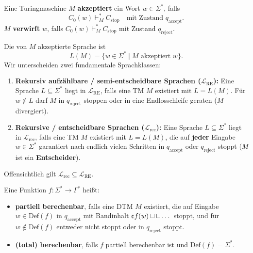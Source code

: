 \begin{definition}
    Eine Turingmaschine $M$ \textbf{akzeptiert} ein Wort $w \in \Sigma^*$, falls
    \[
        C_0(w) \vdash_M^* C_{\mathrm{stop}} \quad \text{mit Zustand } q_{\mathrm{accept}}.
    \]
    $M$ \textbf{verwirft} $w$, falls $C_0(w) \vdash_M^* C_{\mathrm{stop}}$ mit Zustand $q_{\mathrm{reject}}$. 
    
    Die von $M$ akzeptierte Sprache ist
    \[
        L(M) = \{w \in \Sigma^* \mid M \text{ akzeptiert } w\}.
    \]
    Wir unterscheiden zwei fundamentale Sprachklassen:
    \begin{enumerate}
        \item \textbf{Rekursiv aufzählbare / semi-entscheidbare Sprachen ($\mathcal{L}_{\mathrm{RE}}$):}
        Eine Sprache $L \subseteq \Sigma^*$ liegt in $\mathcal{L}_{\mathrm{RE}}$, falls eine TM $M$ existiert mit $L = L(M)$. Für $w \notin L$ darf $M$ in $q_{\mathrm{reject}}$ stoppen oder in eine Endlosschleife geraten ($M$ divergiert).
        \item \textbf{Rekursive / entscheidbare Sprachen ($\mathcal{L}_{\mathrm{rec}}$):}
        Eine Sprache $L \subseteq \Sigma^*$ liegt in $\mathcal{L}_{\mathrm{rec}}$, falls eine TM $M$ existiert mit $L = L(M)$, die auf \textbf{jeder} Eingabe $w \in \Sigma^*$ garantiert nach endlich vielen Schritten in $q_{\mathrm{accept}}$ oder $q_{\mathrm{reject}}$ stoppt ($M$ ist ein \textbf{Entscheider}).
    \end{enumerate}
    Offensichtlich gilt $\mathcal{L}_{\mathrm{rec}} \subseteq \mathcal{L}_{\mathrm{RE}}$.
\end{definition}

\begin{definition}
    Eine Funktion $f : \Sigma^* \to \Gamma^*$ heißt:
    \begin{itemize}
        \item \textbf{partiell berechenbar}, falls eine DTM $M$ existiert, die auf Eingabe $w \in \mathrm{Def}(f)$ in $q_{\mathrm{accept}}$ mit Bandinhalt $\text{\textcent} f(w) \sqcup \sqcup \dots$ stoppt, und für $w \notin \mathrm{Def}(f)$ entweder nicht stoppt oder in $q_{\mathrm{reject}}$ stoppt.
        \item \textbf{(total) berechenbar}, falls $f$ partiell berechenbar ist und $\mathrm{Def}(f) = \Sigma^*$.
    \end{itemize}
\end{definition}

